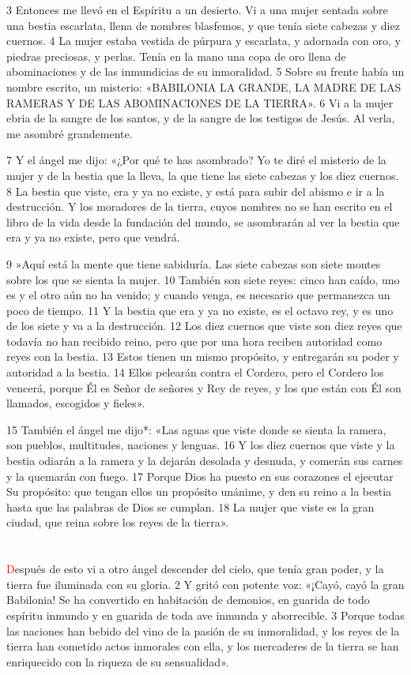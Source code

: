 \documentclass[12pt,twocolumn,twoside]{book}
\begin{document}
3 Entonces me llevó en el Espíritu a un desierto. Vi a una mujer sentada sobre una bestia escarlata, llena de nombres blasfemos, y que tenía siete cabezas y diez cuernos. 4 La mujer estaba vestida de púrpura y escarlata, y adornada con oro, y piedras preciosas, y perlas. Tenía en la mano una copa de oro llena de abominaciones y de las inmundicias de su inmoralidad. 5 Sobre su frente había un nombre escrito, un misterio: «BABILONIA LA GRANDE, LA MADRE DE LAS RAMERAS Y DE LAS ABOMINACIONES DE LA TIERRA». 6 Vi a la mujer ebria de la sangre de los santos, y de la sangre de los testigos de Jesús. Al verla, me asombré grandemente.

7 Y el ángel me dijo: «¿Por qué te has asombrado? Yo te diré el misterio de la mujer y de la bestia que la lleva, la que tiene las siete cabezas y los diez cuernos. 8 La bestia que viste, era y ya no existe, y está para subir del abismo e ir a la destrucción. Y los moradores de la tierra, cuyos nombres no se han escrito en el libro de la vida desde la fundación del mundo, se asombrarán al ver la bestia que era y ya no existe, pero que vendrá.

9 »Aquí está la mente que tiene sabiduría. Las siete cabezas son siete montes sobre los que se sienta la mujer. 10 También son siete reyes: cinco han caído, uno es y el otro aún no ha venido; y cuando venga, es necesario que permanezca un poco de tiempo. 11 Y la bestia que era y ya no existe, es el octavo rey, y es uno de los siete y va a la destrucción. 12 Los diez cuernos que viste son diez reyes que todavía no han recibido reino, pero que por una hora reciben autoridad como reyes con la bestia. 13 Estos tienen un mismo propósito, y entregarán su poder y autoridad a la bestia. 14 Ellos pelearán contra el Cordero, pero el Cordero los vencerá, porque Él es Señor de señores y Rey de reyes, y los que están con Él son llamados, escogidos y fieles».

15 También el ángel me dijo*: «Las aguas que viste donde se sienta la ramera, son pueblos, multitudes, naciones y lenguas. 16 Y los diez cuernos que viste y la bestia odiarán a la ramera y la dejarán desolada y desnuda, y comerán sus carnes y la quemarán con fuego. 17 Porque Dios ha puesto en sus corazones el ejecutar Su propósito: que tengan ellos un propósito unánime, y den su reino a la bestia hasta que las palabras de Dios se cumplan. 18 La mujer que viste es la gran ciudad, que reina sobre los reyes de la tierra».
\chapter{}
\lettrine[lines=4]{\textcolor{red}{D}}{}espués de esto vi a otro ángel descender del cielo, que tenía gran poder, y la tierra fue iluminada con su gloria. 2 Y gritó con potente voz: «¡Cayó, cayó la gran Babilonia! Se ha convertido en habitación de demonios, en guarida de todo espíritu inmundo y en guarida de toda ave inmunda y aborrecible. 3 Porque todas las naciones han bebido del vino de la pasión de su inmoralidad, y los reyes de la tierra han cometido actos inmorales con ella, y los mercaderes de la tierra se han enriquecido con la riqueza de su sensualidad».
\end{document}
